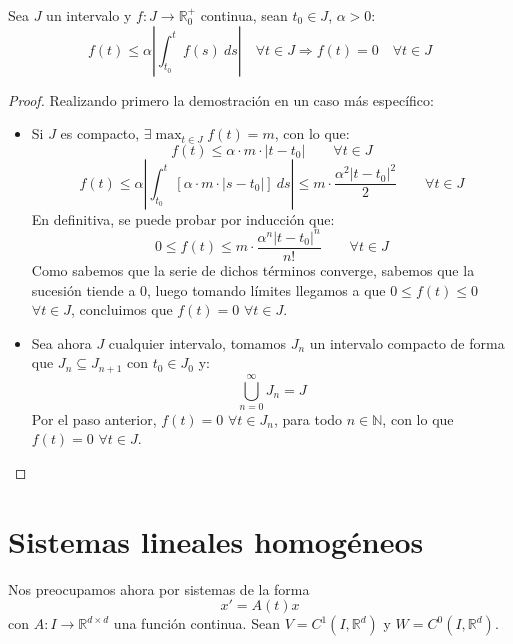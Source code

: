 \begin{lema}\label{lema:unicidad_teo}
    Sea $J$ un intervalo y $f:J\rightarrow \mathbb{R}^+_0$ continua, sean $t_0\in J$, $\alpha >0$:
    \begin{equation*}
        f(t) \leq \alpha\left|\int_{t_0}^{t} f(s)~ds \right| \quad \forall t\in J \Longrightarrow f(t) = 0 \quad \forall t\in J
    \end{equation*}
    \begin{proof}
        Realizando primero la demostración en un caso más específico:
        \begin{itemize}
            \item Si $J$ es compacto, $\exists \max_{t\in J} f(t) = m$, con lo que:
                \begin{equation*}
                    f(t) \leq \alpha \cdot m\cdot  |t-t_0| \qquad \forall t\in J
                \end{equation*}
                \begin{equation*}
                    f(t) \leq \alpha \left|\int_{t_0}^{t} [\alpha \cdot m\cdot  |s-t_0|]~ds \right| \leq m\cdot  \dfrac{\alpha^2 {|t-t_0|}^{2}}{2}\qquad \forall t\in J
                \end{equation*}
                En definitiva, se puede probar por inducción que:
                \begin{equation*}
                    0\leq f(t) \leq m\cdot  \dfrac{\alpha^n {|t-t_0|}^{n}}{n!} \qquad \forall t\in J
                \end{equation*}
                Como sabemos que la serie de dichos términos converge, sabemos que la sucesión tiende a 0, luego tomando límites llegamos a que $0\leq f(t) \leq 0$ $\forall t\in J$, concluimos que $f(t) = 0$ $\forall t\in J$.
            \item Sea ahora $J$ cualquier intervalo, tomamos $J_n$ un intervalo compacto de forma que $J_n \subseteq J_{n+1}$ con $t_0 \in J_0$ y:
                \begin{equation*}
                    \bigcup_{n=0}^\infty J_n = J
                \end{equation*}
                Por el paso anterior, $f(t) = 0$ $\forall t\in J_n$, para todo $n\in \mathbb{N}$, con lo que $f(t) = 0$ $\forall t\in J$.
        \end{itemize}
    \end{proof}
\end{lema}

\section{Sistemas lineales homogéneos}
\noindent
Nos preocupamos ahora por sistemas de la forma
\begin{equation*}\label{eq:lin_sup_h}
    x' = A(t) x
\end{equation*}
con $A:I\rightarrow\mathbb{R}^{d\times d}$ una función continua. Sean $V = C^1(I,\mathbb{R}^d)$ y $W=C^0(I,\mathbb{R}^d)$.

